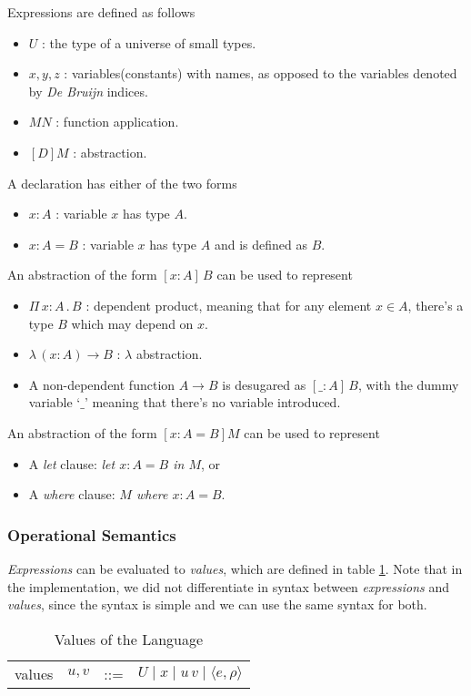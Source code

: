 \documentclass{article}
\theoremstyle{remark}
\begin{document}
Expressions are defined as follows
\begin{itemize}
\item $U$ : the type of a universe of small types. 
\item $x, y, z$ : variables(constants) with names, as opposed to the variables denoted by \emph{De Bruijn} indices.
\item $M N$ : function application.
\item $[D] M$ : abstraction.
\end{itemize}
A declaration has either of the two forms
\begin{itemize}
\item $x : A$ : variable $x$ has type $A$.
\item $x : A = B$ : variable $x$ has type $A$ and is defined as $B$.
\end{itemize}

An abstraction of the form $[x : A]\,B$ can be used to represent
\begin{itemize}
\item $\Pi\,x:A\,.\,B$ : dependent product, meaning that for any element $x \in A$, there's a type $B$ which may depend on $x$.
\item $\lambda\,(x : A) \to B$ : $\lambda$ abstraction.
\item A non-dependent function $A \to B$ is desugared as $[\_ : A]\, B$, with the dummy variable `$\_$' meaning that there's no variable introduced.
\end{itemize}

An abstraction of the form $[x : A = B] M$ can be used to represent
\begin{itemize}
\item A \textit{let} clause: \textit{let $x : A = B$ in $M$}, or
\item A \textit{where} clause: \textit{$M$ where $x : A = B$}.
\end{itemize}

\subsubsection{Operational Semantics}
\emph{Expressions} can be evaluated to \emph{values}, which are defined in table \ref{tab:values}. Note that in the implementation, we did not differentiate in syntax between \emph{expressions} and \emph{values}, since the syntax is simple and we can use the same syntax for both.
\begin{table}[h]
  \centering
  \begin{tabular}{l l l l}
    values & $u, v$ & ::= & $U \mid x \mid u\, v \mid \langle e, \rho \rangle $
  \end{tabular}
  \caption{Values of the Language}
  \label{tab:values}
\end{table}
\end{document}
